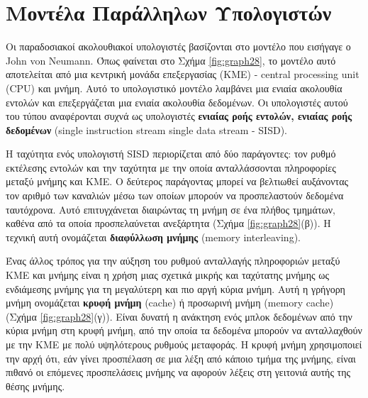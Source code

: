 \documentclass[12pt,a4paper]{article} %
\begin{document}
\section{Μοντέλα Παράλληλων Υπολογιστών}

Οι παραδοσιακοί ακολουθιακοί υπολογιστές βασίζονται στο μοντέλο που εισήγαγε ο
John von Neumann. Όπως φαίνεται στο Σχήμα \ref{fig:graph28}, το μοντέλο αυτό αποτελείται από
μια κεντρική μονάδα επεξεργασίας (ΚΜΕ) - central processing unit (CPU) και μνήμη. Αυτό το υπολογιστικό μοντέλο
λαμβάνει μια ενιαία ακολουθία εντολών και επεξεργάζεται μια ενιαία ακολουθία
δεδομένων. Οι υπολογιστές αυτού του τύπου αναφέρονται συχνά ως υπολογιστές
\textbf{ενιαίας ροής εντολών, ενιαίας ροής δεδομένων} (single instruction stream single data stream - SISD).

Η ταχύτητα ενός υπολογιστή SISD περιορίζεται από δύο παράγοντες: τον ρυθμό
εκτέλεσης εντολών και την ταχύτητα με την οποία ανταλλάσσονται πληροφορίες μεταξύ
μνήμης και ΚΜΕ. Ο δεύτερος παράγοντας μπορεί να βελτιωθεί αυξάνοντας τον αριθμό
των καναλιών μέσω των οποίων μπορούν να προσπελαστούν δεδομένα ταυτόχρονα.
Αυτό επιτυγχάνεται διαιρώντας τη μνήμη σε ένα πλήθος τμημάτων, καθένα από τα
οποία προσπελαύνεται ανεξάρτητα {(}Σχήμα \ref{fig:graph28}(β){)}. Η τεχνική αυτή ονομάζεται
\textbf{διαφύλλωση μνήμης} (memory interleaving).

Ένας άλλος τρόπος για την αύξηση του ρυθμού ανταλλαγής πληροφοριών μεταξύ
ΚΜΕ και μνήμης είναι η χρήση μιας σχετικά μικρής και ταχύτατης μνήμης ως
ενδιάμεσης μνήμης για τη μεγαλύτερη και πιο αργή κύρια μνήμη. Αυτή η γρήγορη
μνήμη ονομάζεται \textbf{κρυφή μνήμη} (cache) ή προσωρινή μνήμη (memory cache) {(}Σχήμα \ref{fig:graph28}(γ){)}. Είναι δυνατή η ανάκτηση
ενός μπλοκ δεδομένων από την κύρια μνήμη στη κρυφή μνήμη, από την οποία τα
δεδομένα μπορούν να ανταλλαχθούν με την ΚΜΕ με πολύ υψηλότερους ρυθμούς
μεταφοράς. Η κρυφή μνήμη χρησιμοποιεί την αρχή ότι, εάν γίνει προσπέλαση σε μια
λέξη από κάποιο τμήμα της μνήμης, είναι πιθανό οι επόμενες προσπελάσεις μνήμης
να αφορούν λέξεις στη γειτονιά αυτής της θέσης μνήμης.
\end{document}
